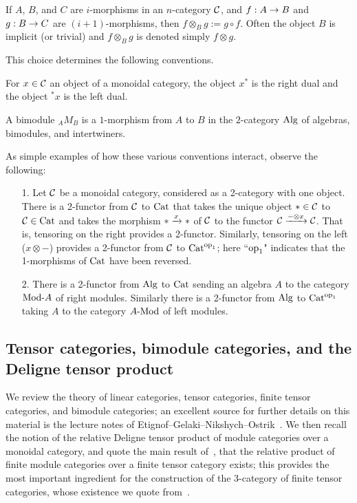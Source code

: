 \documentclass{amsart}
\begin{document}
\begin{definition} \label{def-tensorcomp}
If $A$, $B$, and $C$ are $i$-morphisms in an $n$-category $\mathcal C$, and $f: A \rightarrow B$ and $g: B \rightarrow C$ are $(i+1)$-morphisms, then $f \otimes_B g := g \circ f$.  Often the object $B$ is implicit (or trivial) and $f \otimes_B g$ is denoted simply $f \otimes g$.
\end{definition}

This choice determines the following conventions.
\begin{definition}
For $x \in \mathcal C$ an object of a monoidal category, the object $x^*$ is the right dual and the object ${}^*x$ is the left dual.
\end{definition}
\begin{definition}
A bimodule ${}_A M_B$ is a $1$-morphism from $A$ to $B$ in the $2$-category $\mathrm{Alg}$ of algebras, bimodules, and intertwiners.
\end{definition}

As simple examples of how these various conventions interact, observe the following:
\begin{itemize}
\item[1.] Let $\mathcal C$ be a monoidal category, considered as a 2-category with one object.  There is a 2-functor from $\mathcal C$ to $\mathrm{Cat}$ that takes the unique object $\ast \in \mathcal C$ to $\mathcal C \in \mathrm{Cat}$ and takes the morphism $\ast \xrightarrow{x} \ast$ of $\mathcal C$ to the functor $\mathcal C \xrightarrow{- \otimes x} \mathcal C$.  That is, tensoring on the right provides a 2-functor.  Similarly, tensoring on the left ($x \otimes -$) provides a 2-functor from $\mathcal C$ to $\mathrm{Cat}^{\mathrm{op}_1}$; here ``$\mathrm{op}_1$" indicates that the 1-morphisms of $\mathrm{Cat}$ have been reversed.
\item[2.] There is a 2-functor from $\mathrm{Alg}$ to $\mathrm{Cat}$ sending an algebra $A$ to the category $\Mod{}{A}$ of right modules.  Similarly there is a 2-functor from $\mathrm{Alg}$ to $\mathrm{Cat}^{\mathrm{op}_1}$ taking $A$ to the category $\Mod{A}{}$ of left modules.
\end{itemize}


\subsection{Tensor categories, bimodule categories, and the Deligne tensor product} \label{sec:tc-lincat}


We review the theory of linear categories, tensor categories, finite tensor categories, and bimodule categories; an excellent source for further details on this material is the lecture notes of Etignof--Gelaki--Nikshych--Ostrik~\cite{EGNO}.  We then recall the notion of the relative Deligne tensor product of module categories over a monoidal category, and quote the main result of~\cite{BTP}, that the relative product of finite module categories over a finite tensor category exists; this provides the most important ingredient for the construction of the 3-category of finite tensor categories, whose existence we quote from~\cite{3TC}.
\end{document}

